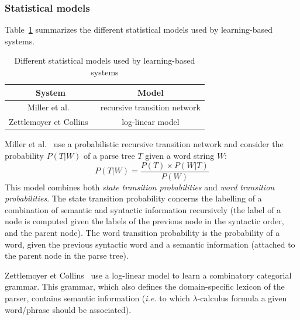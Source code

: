 \documentclass[10pt,journal,letterpaper,compsoc]{IEEEtran}
\begin{document}
\subsubsection{Statistical models}
\label{sec:statistical-model}
Table~\ref{tab:statistical-models} summarizes the different statistical models
used by learning-based systems.
\begin{table}
\centering
\begin{tabular}{|c|c|}\hline
{\bf System} & {\bf Model}\\\hline\hline
Miller et al.~\cite{Miller:1996:FSA:981863.981871} & recursive transition
network\\\hline
Zettlemoyer et Collins~\cite{DBLP:conf/uai/ZettlemoyerC05} & log-linear
model\\\hline
\end{tabular}
\caption{Different statistical models used by learning-based systems}
\label{tab:statistical-models}
\end{table}
Miller et al.~\cite{Miller:1996:FSA:981863.981871} use a probabilistic recursive
transition network and consider the probability $P(T|W)$ of a parse tree $T$
given a word string $W$:
$$P(T|W)=\frac{P(T)\times P(W|T)}{P(W)}$$
This model combines both {\it state transition probabilities} and {\it word
transition probabilities}. The state transition probability concerns the
labelling of a combination of semantic and syntactic information recursively
(the label of a node is computed given the labels of the previous node in the
syntactic order, and the parent node).
The word transition probability is the probability of a word, given the previous
syntactic word and a semantic information (attached to the parent node in the
parse tree).

Zettlemoyer et Collins~\cite{DBLP:conf/uai/ZettlemoyerC05} use a log-linear
model to learn a combinatory categorial grammar.
This grammar, which also defines the domain-specific lexicon of the parser,
contains semantic information ({\it i.e.} to which $\lambda$-calculus formula a
given word/phrase should be associated).
\end{document}
